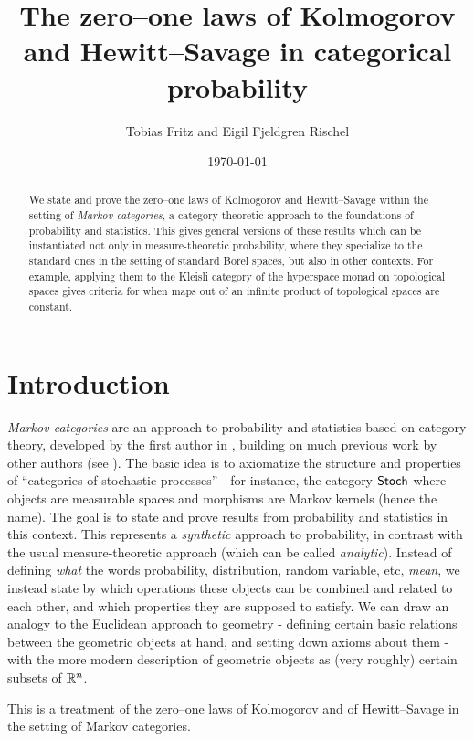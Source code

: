\documentclass[11pt]{article}
\author{Tobias Fritz and Eigil Fjeldgren Rischel}
\title{The zero--one laws of Kolmogorov and Hewitt--Savage in categorical probability}
\date{\today}
\begin{document}
\maketitle

\begin{abstract}
	We state and prove the zero--one laws of Kolmogorov and Hewitt--Savage within the setting of \emph{Markov categories}, a category-theoretic approach to the foundations of probability and statistics. This gives general versions of these results which can be instantiated not only in measure-theoretic probability, where they specialize to the standard ones in the setting of standard Borel spaces, but also in other contexts. For example, applying them to the Kleisli category of the hyperspace monad on topological spaces gives criteria for when maps out of an infinite product of topological spaces are constant.
\end{abstract}

\tableofcontents

\section{Introduction}

\emph{Markov categories} are an approach to probability and statistics based on category theory, developed by the first author in \cite{markov_cats}, building on much previous work by other authors (see ).
The basic idea is to axiomatize the structure and properties of ``categories of stochastic processes'' - for instance, the category $\operatorname{\mathsf{Stoch}}$ where objects are measurable spaces and morphisms are Markov kernels (hence the name).
The goal is to state and prove results from probability and statistics in this context.
This represents a \emph{synthetic} approach to probability, in contrast with the usual measure-theoretic approach (which can be called \emph{analytic}).
Instead of defining \emph{what} the words probability, distribution, random variable, etc, \emph{mean}, we instead state by which operations these objects can be combined and related to each other, and which properties they are supposed to satisfy.
We can draw an analogy to the Euclidean approach to geometry - defining certain basic relations between the geometric objects at hand, and setting down axioms about them - with the more modern description of geometric objects as (very roughly) certain subsets of $\mathbb{R}^n$.

This is a treatment of the zero--one laws of Kolmogorov and of Hewitt--Savage in the setting of Markov categories.
\end{document}
